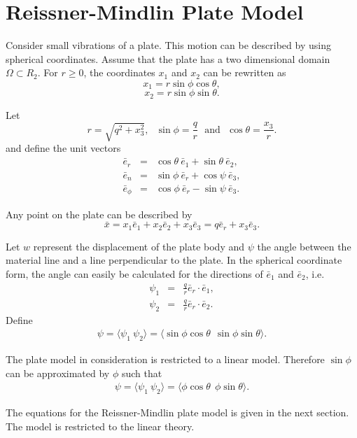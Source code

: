 \documentclass[../../main.tex]{subfiles}
\begin{document}
	\section{Reissner-Mindlin Plate Model} \label{sec:P_Model}
	Consider small vibrations of a plate. This motion can be described by using spherical coordinates. Assume that the plate has a two dimensional domain $\Omega \subset R_2$. For $r \geq 0$, the coordinates $x_1$ and $x_2$ can be rewritten as
	\[ x_1 = r \sin \phi \cos \theta, \]
	\[ x_2 = r \sin \phi \sin \theta. \]
	
	Let
	\[ r = \sqrt{q^2 + x_3^2},~~~\sin \phi = \frac{q}{r}~~~\textrm{and}~~~\cos \theta = \frac{x_3}{r}.\]
	and define the unit vectors
	\begin{eqnarray*}
		\bar e_r &=& \cos \theta ~\bar e_1 + \sin \theta ~\bar e_2,\\
		\bar e_n &=& \sin \phi~\bar e_r + \cos \psi~\bar e_3, \\
		\bar e_\phi &=& \cos \phi~\bar e_r - \sin \psi~\bar e_3.
	\end{eqnarray*}
	
	Any point on the plate can be described by
	\[ \bar{x} = x_1 \bar e_1 + x_2 \bar e_2 + x_3 \bar e_3 = q \bar e_r + x_3 \bar e_3. \] \label{sym:en}
	
	
	Let $w$ represent the displacement of the plate body and $\psi$ the angle between the material line and a line perpendicular to the plate. In the spherical coordinate form, the angle can easily be calculated for the directions of $\bar{e}_1$ and $\bar{e}_2$, i.e.
	\begin{eqnarray*}
		\psi_1 & = & \frac{q}{r} \bar{e}_r \cdot \bar{e}_1, \\
		\psi_2 & = & \frac{q}{r} \bar{e}_r \cdot \bar{e}_2.
	\end{eqnarray*}
	Define
	\begin{eqnarray*}
		{\psi} = \langle \psi_1 \  \psi_2\rangle = \langle \sin\phi \cos \theta \ \ \sin\phi \sin \theta\rangle.
	\end{eqnarray*}
	
	The plate model in consideration is restricted to a linear model. Therefore $\sin\phi$ can be approximated by $\phi$ such that
	\begin{eqnarray*}
		{\psi} = \langle \psi_1 \  \psi_2\rangle = \langle \phi \cos \theta \ \ \phi \sin \theta \rangle.
	\end{eqnarray*}
	
	The equations for the Reissner-Mindlin plate model is given in the next section. The model is restricted to the linear theory.
	
\end{document}
